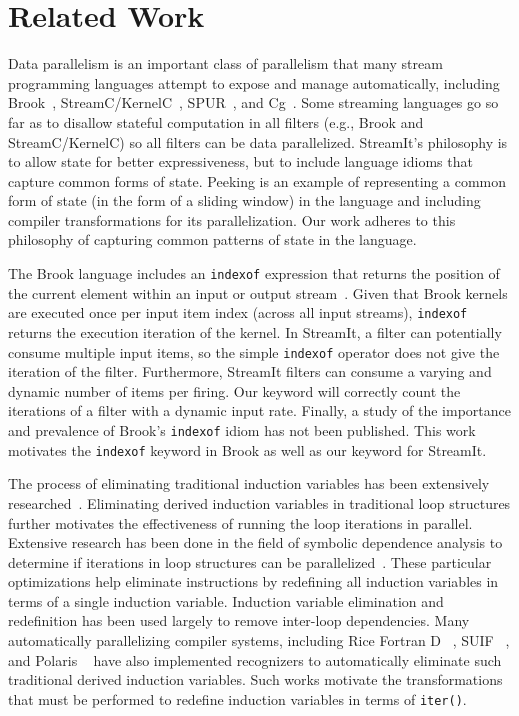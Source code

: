 \section{Related Work}
\label{sec:related}

Data parallelism is an important class of parallelism that many stream
programming languages attempt to expose and manage automatically,
including Brook~\cite{brook04}, StreamC/KernelC~\cite{imagine03ieee},
SPUR~\cite{spur05samos}, and Cg~\cite{cg03}.  Some streaming languages
go so far as to disallow stateful computation in all filters (e.g.,
Brook and StreamC/KernelC) so all filters can be data parallelized.
StreamIt's philosophy is to allow state for better expressiveness, but
to include language idioms that capture common forms of state.
Peeking is an example of representing a common form of state (in the
form of a sliding window) in the language and including compiler
transformations for its parallelization.  Our work adheres to this
philosophy of capturing common patterns of state in the language.

The Brook language includes an {\tt indexof} expression that returns
the position of the current element within an input or output
stream~\cite{brook04}.  Given that Brook kernels are executed once per
input item index (across all input streams), {\tt indexof} returns the
execution iteration of the kernel.  In StreamIt, a filter can
potentially consume multiple input items, so the simple {\tt indexof}
operator does not give the iteration of the filter.  Furthermore,
StreamIt filters can consume a varying and dynamic number of items per
firing.  Our \iter keyword will correctly count the iterations of a
filter with a dynamic input rate. Finally, a study of the importance
and prevalence of Brook's {\tt indexof} idiom has not been published.
This work motivates the {\tt indexof} keyword in Brook as well as our
\iter keyword for StreamIt.

The process of eliminating traditional induction variables has been
extensively researched~\cite{Bacon:1994,RM99:RRV}.  Eliminating
derived induction variables in traditional loop structures further
motivates the effectiveness of running the loop iterations in
parallel.  Extensive research has been done in the field of symbolic
dependence analysis to determine if iterations in loop structures can
be parallelized~\cite{Maydan:1991,Blume:1994}.  These particular
optimizations help eliminate instructions by redefining all induction
variables in terms of a single induction variable.  Induction variable
elimination and redefinition has been used largely to remove
inter-loop dependencies.  Many automatically parallelizing compiler
systems, including Rice Fortran D ~\cite{Hiranandani:1992}, SUIF
~\cite{Wilson:1994}, and Polaris ~\cite{Blume:1996} have also
implemented recognizers to automatically eliminate such traditional
derived induction variables.  Such works motivate the transformations
that must be performed to redefine induction variables in terms of
{\tt iter()}.


